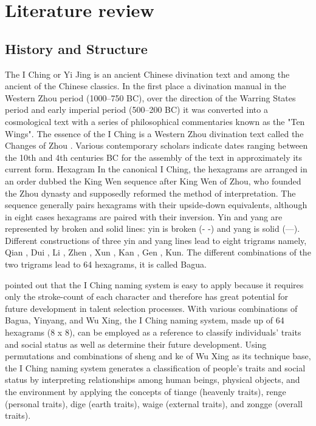 \documentclass[conference]{IEEEtran}
\begin{document}
\section{Literature review}
\subsection{History and Structure}
The I Ching or Yi Jing is an ancient Chinese divination text and among the ancient of the Chinese classics. In the first place a divination manual in the Western Zhou period (1000–750 BC), over the direction of the Warring States period and early imperial period (500–200 BC) it was converted into a cosmological text with a series of philosophical commentaries known as the "Ten Wings".\cite{20}
The essence of the I Ching is a Western Zhou divination text called the Changes of Zhou .\cite{21} Various contemporary scholars indicate dates ranging between the 10th and 4th centuries BC for the assembly of the text in approximately its current form.\cite{22} 
Hexagram
In the canonical I Ching, the hexagrams are arranged in an order dubbed the King Wen sequence after King Wen of Zhou, who founded the Zhou dynasty and supposedly reformed the method of interpretation. The sequence generally pairs hexagrams with their upside-down equivalents, although in eight cases hexagrams are paired with their inversion.\cite{23} 
Yin and yang are represented by broken and solid lines: yin is broken (- -) and yang is solid (---). Different constructions of three yin and yang lines lead to eight trigrams namely, Qian , Dui , Li , Zhen , Xun , Kan , Gen , Kun.
The different combinations of the two trigrams lead to 64 hexagrams, it is called Bagua.

\cite{5} pointed out that the I Ching naming system is easy to apply because it requires only the stroke-count of each character and therefore has great potential for future development in talent selection processes. With various combinations of Bagua, Yinyang, and Wu Xing, the I Ching naming system, made up of 64 hexagrams (8 x 8), can be employed as a reference to classify individuals’ traits and social status as well as determine their future development. Using permutations and combinations of sheng and ke of Wu
Xing as its technique base, the I Ching naming system generates a classification of people’s traits and social status by interpreting relationships among human beings, physical objects,
and the environment by applying the concepts of tiange (heavenly traits), renge (personal
traits), dige (earth traits), waige (external traits), and zongge (overall traits).
\end{document}
